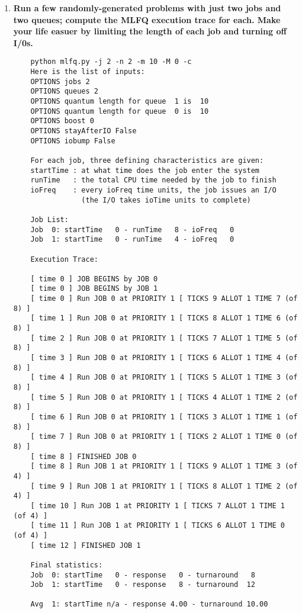 \documentclass{article}
\begin{document}
\begin{enumerate}

    \item \textbf{Run a few randomly-generated problems with just two jobs and two queues; compute the MLFQ execution trace for each. Make your life easuer by limiting the length of each job and turning off I/0s.}
    \begin{verbatim}
    python mlfq.py -j 2 -n 2 -m 10 -M 0 -c
    Here is the list of inputs:
    OPTIONS jobs 2
    OPTIONS queues 2
    OPTIONS quantum length for queue  1 is  10
    OPTIONS quantum length for queue  0 is  10
    OPTIONS boost 0
    OPTIONS stayAfterIO False
    OPTIONS iobump False

    For each job, three defining characteristics are given:
    startTime : at what time does the job enter the system
    runTime   : the total CPU time needed by the job to finish
    ioFreq    : every ioFreq time units, the job issues an I/O
                (the I/O takes ioTime units to complete)

    Job List:
    Job  0: startTime   0 - runTime   8 - ioFreq   0
    Job  1: startTime   0 - runTime   4 - ioFreq   0

    Execution Trace:

    [ time 0 ] JOB BEGINS by JOB 0
    [ time 0 ] JOB BEGINS by JOB 1
    [ time 0 ] Run JOB 0 at PRIORITY 1 [ TICKS 9 ALLOT 1 TIME 7 (of 8) ]
    [ time 1 ] Run JOB 0 at PRIORITY 1 [ TICKS 8 ALLOT 1 TIME 6 (of 8) ]
    [ time 2 ] Run JOB 0 at PRIORITY 1 [ TICKS 7 ALLOT 1 TIME 5 (of 8) ]
    [ time 3 ] Run JOB 0 at PRIORITY 1 [ TICKS 6 ALLOT 1 TIME 4 (of 8) ]
    [ time 4 ] Run JOB 0 at PRIORITY 1 [ TICKS 5 ALLOT 1 TIME 3 (of 8) ]
    [ time 5 ] Run JOB 0 at PRIORITY 1 [ TICKS 4 ALLOT 1 TIME 2 (of 8) ]
    [ time 6 ] Run JOB 0 at PRIORITY 1 [ TICKS 3 ALLOT 1 TIME 1 (of 8) ]
    [ time 7 ] Run JOB 0 at PRIORITY 1 [ TICKS 2 ALLOT 1 TIME 0 (of 8) ]
    [ time 8 ] FINISHED JOB 0
    [ time 8 ] Run JOB 1 at PRIORITY 1 [ TICKS 9 ALLOT 1 TIME 3 (of 4) ]
    [ time 9 ] Run JOB 1 at PRIORITY 1 [ TICKS 8 ALLOT 1 TIME 2 (of 4) ]
    [ time 10 ] Run JOB 1 at PRIORITY 1 [ TICKS 7 ALLOT 1 TIME 1 (of 4) ]
    [ time 11 ] Run JOB 1 at PRIORITY 1 [ TICKS 6 ALLOT 1 TIME 0 (of 4) ]
    [ time 12 ] FINISHED JOB 1

    Final statistics:
    Job  0: startTime   0 - response   0 - turnaround   8
    Job  1: startTime   0 - response   8 - turnaround  12

    Avg  1: startTime n/a - response 4.00 - turnaround 10.00
    \end{verbatim}
    

\end{enumerate}
\end{document}

